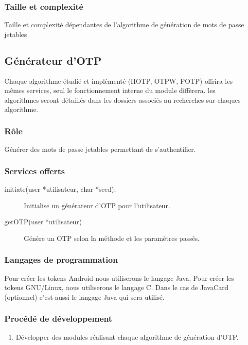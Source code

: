 \documentclass{"../../res/univ-projet"}
\begin{document}
    \subsubsection{Taille et complexité}
            Taille et complexité dépendantes de l'algorithme de génération
        de mots de passe jetables

\subsection{Générateur d'OTP}
    Chaque algorithme étudié et implémenté (HOTP, OTPW, POTP) offrira les
    mêmes services, seul le fonctionnement interne du module diffèrera.
    les algorithmes seront détaillés dans les dossiers associés au recherches sur 
    chaques algorithme.
    \subsubsection{Rôle}
        Générer des mots de passe jetables permettant de s'authentifier.

    \subsubsection{Services offerts}
    \begin{description}
        \item[initiate(user *utilisateur, char *seed):] Initialise
            un générateur d'OTP pour l'utilisateur.
        \item[getOTP(user *utilisateur)] Génère un OTP selon la méthode et les
            paramètres passés.
    \end{description}

    \subsubsection{Langages de programmation}
        Pour créer les tokens Android nous utiliserons le langage Java.
    Pour créer les tokens GNU/Linux, nous utiliserons le langage C.
    Dans le cas de JavaCard (optionnel) c'est aussi le langage Java qui sera
    utilisé.

    \subsubsection{Procédé de développement}
    \begin{enumerate}
        \item Développer des modules réalisant chaque algorithme de génération
            d'OTP.
    \end{enumerate}
\end{document}
